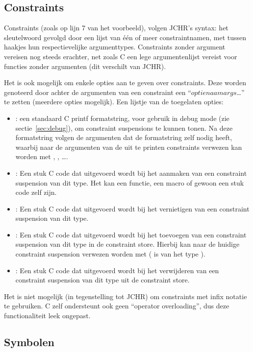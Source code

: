 \subsection{Constraints}

Constraints (zoals op lijn 7 van het voorbeeld), volgen JCHR's syntax: het  sleutelwoord gevolgd door een lijst van \'e\'en of meer constraintnamen, met tussen haakjes hun respectievelijke argumenttypes. Constraints zonder argument vereisen nog steeds \code{()} erachter, net zoals C een lege argumentenlijst vereist voor functies zonder argumenten (dit verschilt van JCHR).

Het is ook mogelijk om enkele opties aan te geven over constraints. Deze worden genoteerd door achter de argumenten van een constraint een ``$optienaam$\code{,}$args$\ldots\code{)}'' te zetten (meerdere opties mogelijk). Een lijstje van de
toegelaten opties: \begin{itemize}
  \item {}: een standaard C printf formatstring, voor gebruik in debug mode (zie sectie~\ref{sec:debug}), om constraint suspensions te kunnen tonen. Na deze formatstring volgen de argumenten dat de formatstring zelf nodig heeft, waarbij naar de argumenten van de uit te printen constraints verwezen kan worden met , , \ldots.
  \item {}: Een stuk C code dat uitgevoerd wordt bij het aanmaken van een constraint suspension van dit type. Het kan een functie, een macro of gewoon een stuk code zelf zijn.
  \item {}: Een stuk C code dat uitgevoerd wordt bij het vernietigen van een constraint suspension van dit type. 
  \item {}: Een stuk C code dat uitgevoerd wordt bij het toevoegen van een constraint suspension van dit type in de constraint store. Hierbij kan naar de huidige constraint suspension verwezen worden met  ( is van het type ).
  \item {}: Een stuk C code dat uitgevoerd wordt bij het verwijderen van een constraint suspension van dit type uit de constraint store.
\end{itemize}

Het is niet mogelijk (in tegenstelling tot JCHR) om constraints met infix notatie te gebruiken. C zelf ondersteunt ook geen ``operator overloading'', dus deze functionaliteit leek ongepast.

\subsection{Symbolen}


